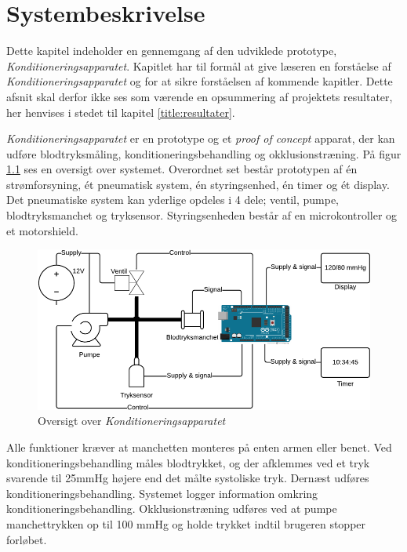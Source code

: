\chapter{Systembeskrivelse}
Dette kapitel indeholder en gennemgang af den udviklede prototype, \textit{Konditioneringsapparatet}. Kapitlet har til formål at give læseren en forståelse af \textit{Konditioneringsapparatet} og for at sikre forståelsen af kommende kapitler. Dette afsnit skal derfor ikke ses som værende en opsummering af projektets resultater, her henvises i stedet til kapitel \ref{title:resultater}.

\textit{Konditioneringsapparatet} er en prototype og et \textit{proof of concept} apparat, der kan udføre blodtryksmåling, konditioneringsbehandling og okklusionstræning. På figur \ref{fig:systemTegning} ses en oversigt over systemet. Overordnet set består prototypen af én strømforsyning, ét pneumatisk system, én styringsenhed, én timer og ét display. Det pneumatiske system kan yderlige opdeles i 4 dele; ventil, pumpe, blodtryksmanchet og tryksensor. Styringsenheden består af en microkontroller og et motorshield. 

\begin{figure}[H]
	\centering
	\includegraphics[width = \textwidth]{billeder/systemDrawing-crop.pdf}
	\caption{Oversigt over \textit{Konditioneringsapparatet}} \label{fig:systemTegning}
\end{figure}

Alle funktioner kræver at manchetten monteres på enten armen eller benet. Ved konditioneringsbehandling måles blodtrykket, og der afklemmes ved et tryk svarende til 25mmHg højere end det målte systoliske tryk. Dernæst udføres konditioneringsbehandling. Systemet logger information omkring konditioneringsbehandling. Okklusionstræning udføres ved at pumpe manchettrykken op til 100 mmHg og holde trykket indtil brugeren stopper forløbet. 

